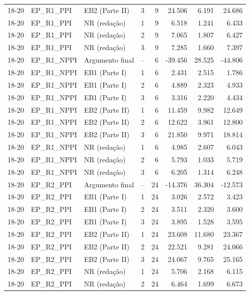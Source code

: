 \begin{longtable}{lllcrrrr}
18-20 & EP\_R1\_PPI & EB2 (Parte II) & 3 & 9 & 24.506 & 6.191 & 24.686 \\
18-20 & EP\_R1\_PPI & NR (redação) & 1 & 9 & 6.518 & 1.241 & 6.433 \\
18-20 & EP\_R1\_PPI & NR (redação) & 2 & 9 & 7.065 & 1.807 & 6.427 \\
18-20 & EP\_R1\_PPI & NR (redação) & 3 & 9 & 7.285 & 1.660 & 7.397 \\
18-20 & EP\_R1\_NPPI & Argumento final & -- & 6 & -39.456 & 28.525 & -44.806 \\
18-20 & EP\_R1\_NPPI & EB1 (Parte I) & 1 & 6 & 2.431 & 2.515 & 1.786 \\
18-20 & EP\_R1\_NPPI & EB1 (Parte I) & 2 & 6 & 4.889 & 2.323 & 4.933 \\
18-20 & EP\_R1\_NPPI & EB1 (Parte I) & 3 & 6 & 3.316 & 2.220 & 4.434 \\
18-20 & EP\_R1\_NPPI & EB2 (Parte II) & 1 & 6 & 11.459 & 9.982 & 12.649 \\
18-20 & EP\_R1\_NPPI & EB2 (Parte II) & 2 & 6 & 12.622 & 3.961 & 12.800 \\
18-20 & EP\_R1\_NPPI & EB2 (Parte II) & 3 & 6 & 21.850 & 9.971 & 18.814 \\
18-20 & EP\_R1\_NPPI & NR (redação) & 1 & 6 & 4.985 & 2.607 & 6.043 \\
18-20 & EP\_R1\_NPPI & NR (redação) & 2 & 6 & 5.793 & 1.033 & 5.719 \\
18-20 & EP\_R1\_NPPI & NR (redação) & 3 & 6 & 6.205 & 1.314 & 6.248 \\
18-20 & EP\_R2\_PPI & Argumento final & -- & 24 & -14.376 & 36.304 & -12.573 \\
18-20 & EP\_R2\_PPI & EB1 (Parte I) & 1 & 24 & 3.026 & 2.572 & 3.423 \\
18-20 & EP\_R2\_PPI & EB1 (Parte I) & 2 & 24 & 3.511 & 2.320 & 3.600 \\
18-20 & EP\_R2\_PPI & EB1 (Parte I) & 3 & 24 & 3.895 & 1.528 & 3.595 \\
18-20 & EP\_R2\_PPI & EB2 (Parte II) & 1 & 24 & 23.608 & 11.680 & 23.367 \\
18-20 & EP\_R2\_PPI & EB2 (Parte II) & 2 & 24 & 22.521 & 9.281 & 24.066 \\
18-20 & EP\_R2\_PPI & EB2 (Parte II) & 3 & 24 & 24.067 & 9.765 & 25.165 \\
18-20 & EP\_R2\_PPI & NR (redação) & 1 & 24 & 5.706 & 2.168 & 6.115 \\
18-20 & EP\_R2\_PPI & NR (redação) & 2 & 24 & 6.464 & 1.699 & 6.673 \\

\end{longtable}
